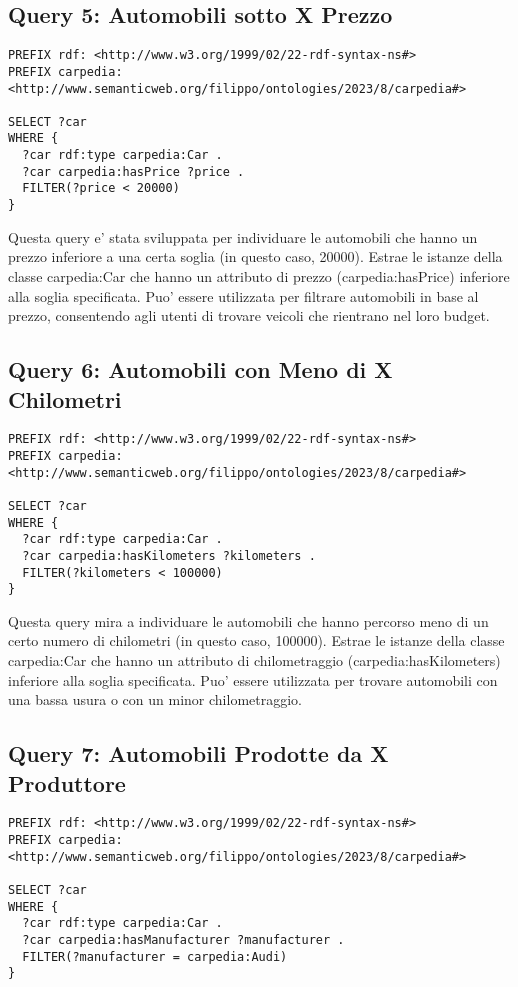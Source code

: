 \subsection{Query 5: Automobili sotto X Prezzo}

\begin{lstlisting}[language=SPARQL]
PREFIX rdf: <http://www.w3.org/1999/02/22-rdf-syntax-ns#>
PREFIX carpedia: <http://www.semanticweb.org/filippo/ontologies/2023/8/carpedia#>

SELECT ?car
WHERE {
  ?car rdf:type carpedia:Car .
  ?car carpedia:hasPrice ?price .
  FILTER(?price < 20000)
}
\end{lstlisting}

Questa query e' stata sviluppata per individuare le automobili che hanno un prezzo inferiore a una certa
soglia (in questo caso, 20000). Estrae le istanze della classe carpedia:Car che hanno un attributo di prezzo
(carpedia:hasPrice) inferiore alla soglia specificata. Puo' essere utilizzata per filtrare automobili in base
al prezzo, consentendo agli utenti di trovare veicoli che rientrano nel loro budget.

\subsection{Query 6: Automobili con Meno di X Chilometri}

\begin{lstlisting}[language=SPARQL]
PREFIX rdf: <http://www.w3.org/1999/02/22-rdf-syntax-ns#>
PREFIX carpedia: <http://www.semanticweb.org/filippo/ontologies/2023/8/carpedia#>

SELECT ?car
WHERE {
  ?car rdf:type carpedia:Car .
  ?car carpedia:hasKilometers ?kilometers .
  FILTER(?kilometers < 100000)
}
\end{lstlisting}


Questa query mira a individuare le automobili che hanno percorso meno di un certo numero di chilometri
(in questo caso, 100000). Estrae le istanze della classe carpedia:Car che hanno un attributo di chilometraggio
(carpedia:hasKilometers) inferiore alla soglia specificata.
Puo' essere utilizzata per trovare automobili con una bassa usura o con un minor chilometraggio.

\subsection{Query 7: Automobili Prodotte da X Produttore}

\begin{lstlisting}[language=SPARQL]
PREFIX rdf: <http://www.w3.org/1999/02/22-rdf-syntax-ns#>
PREFIX carpedia: <http://www.semanticweb.org/filippo/ontologies/2023/8/carpedia#>

SELECT ?car
WHERE {
  ?car rdf:type carpedia:Car .
  ?car carpedia:hasManufacturer ?manufacturer .
  FILTER(?manufacturer = carpedia:Audi)
}
\end{lstlisting}


